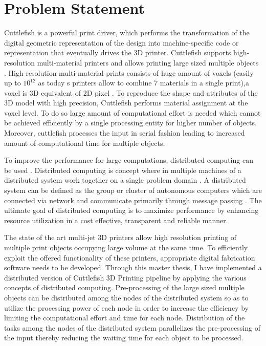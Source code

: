 \section{Problem Statement}

Cuttlefish \cite{cuttlefish} is a powerful print driver, which performs the transformation of the digital geometric representation of the design into machine-specific code or representation that eventually drives the 3D printer. Cuttlefish supports high-resolution multi-material printers and allows printing large sized multiple objects . High-resolution multi-material prints consists of huge amount of voxels (easily up to \begin{math}10^{12}\end{math} as today \textquotesingle s printers allow to combine 7 materials in a single print),a voxel is 3D equivalent of 2D pixel \cite{3DString}. To reproduce the shape and attributes of the 3D model with high precision, Cuttlefish performs material assignment at the voxel level. To do so large amount of computational effort is needed which cannot be achieved efficiently by a single processing entity for higher number of objects.  Moreover, cuttlefish processes the input in serial fashion leading to increased amount of computational time for multiple objects. \newline

To improve the performance for large computations, distributed computing can be used \cite{DistComp} \cite{Desai}.  Distributed computing is concept where in multiple machines of a distributed system work together on a single problem domain \cite{rouse}.  A distributed system can be defined as the group or cluster of autonomous computers which are connected via network and communicate primarily through message passing \cite{coulouris}. The ultimate goal of distributed computing is to maximize performance by enhancing resource utilization in a cost effective, transparent and reliable manner.\newline

The state of the art multi-jet 3D printers allow high resolution printing of multiple print objects occupying large volume at the same time. To efficiently exploit the offered functionality of these printers, appropriate digital fabrication software needs to be developed. Through this master thesis, I have implemented a distributed version of Cuttlefish 3D Printing pipeline by applying the various concepts of distributed computing. Pre-processing of the large sized multiple objects can be distributed among the nodes of the distributed system so as to utilize the processing power of each node in order to increase the efficiency by limiting the computational effort and time for each node. Distribution of the tasks among the nodes of the distributed system parallelizes the pre-processing of the input thereby reducing the waiting time for each object to be processed. 

